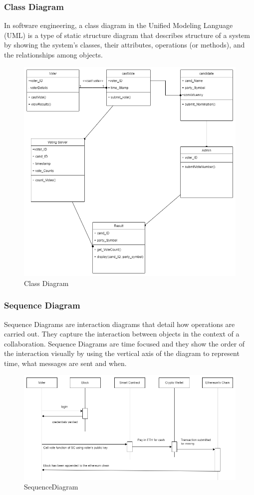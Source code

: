\documentclass[oneside, 12pt]{book}
\begin{document}
\subsubsection{Class Diagram}
In software engineering, a class diagram in the Unified Modeling Language (UML) is a type of static structure diagram that describes structure of a system by showing the system’s classes, their attributes, operations (or methods), and the relationships among objects.
\begin{figure}[H]
	\centering
	\includegraphics[width=\linewidth]{./Resources/class.png}
	\caption{Class Diagram}
	\label{fig:class}
\end{figure}
\newpage
\subsubsection{Sequence Diagram}
Sequence Diagrams are interaction diagrams that detail how operations are carried out. They capture the interaction between objects in the context of a collaboration. Sequence Diagrams are time focused and they show the order of the interaction visually by using the vertical axis of the diagram to represent time, what messages are sent and when.
\begin{figure}[H]
	\centering
	\includegraphics[width=\linewidth]{./Resources/sequence.png}
	\caption{SequenceDiagram}
	\label{fig:sequence}
\end{figure}
\newpage
\end{document}
